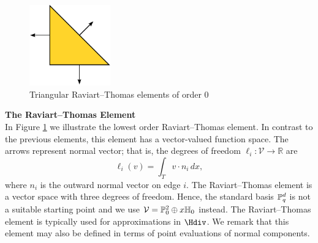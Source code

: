 \begin{figure}
  \begin{center}
    \includegraphics[height=3.5cm]{chapters/kirby-6/pdf/RT0.pdf} 
    \caption{Triangular Raviart--Thomas elements of order 0}
    \label{Raviart-Thomas}
  \end{center}
\end{figure}

\begin{example}{\bf{The Raviart--Thomas Element}} \\
In Figure \ref{Raviart-Thomas} we illustrate the lowest order Raviart--Thomas element.
In contrast to the previous elements, this element has a vector-valued
function space.  The arrows represent normal vector; that is, the 
degrees of freedom $\ell_i : \mathcal{V} \rightarrow \mathbb{R}$ are  
\begin{equation}
\ell_i ( v) = \int_{T} v \cdot n_i  \, dx ,  
\end{equation}
where $n_i$ is the outward normal vector on edge $i$.
The Raviart--Thomas element is a vector space with three degrees of freedom. Hence, 
the standard basis $\P^d_q$ is not a suitable starting point and we use 
$\mathcal{V} = \P_0^2 \oplus x \H_0$ instead.   
The Raviart--Thomas element is typically used for approximations in $\Hdiv$.
We remark that this element may also be defined in terms of point evaluations of normal components.
\end{example}

%

